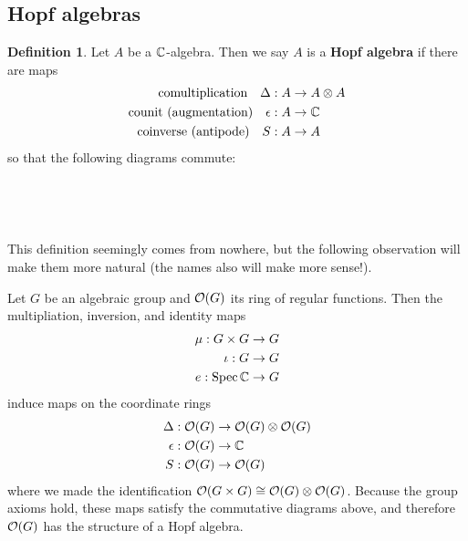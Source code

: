 \documentclass{amsart}
\numberwithin{equation}{section}
\theoremstyle{plain} %
\theoremstyle{definition}
\newtheorem{definition}[equation]{Definition}
\theoremstyle{remark}
\begin{document}
\subsection{Hopf algebras}
\begin{definition}\label{def:hopf}
    Let $A$ be a $\mathbb{C}$-algebra. Then we say $A$ is a \textbf{Hopf algebra} if there are maps \begin{align*}
        \text{comultiplication\quad}\Delta: A &\to A\otimes A \\
        \text{counit (augmentation)\quad}\epsilon: A &\to \mathbb{C} \\
        \text{coinverse (antipode)\quad}S: A &\to A
    \end{align*}
    so that the following diagrams commute:
    \begin{center}
         \\

         \\
        

    \end{center}
\end{definition}
This definition seemingly comes from nowhere, but the following observation will make them more natural
(the names also will make more sense!).

\hfill

Let $G$ be an algebraic group and $\mathcal{O}(G)$ its ring of regular functions. Then the multipliation,
inversion, and identity maps \begin{align*}
    \mu: G\times G &\to G \\
    \iota: G &\to G \\
    e: \operatorname{Spec} \mathbb{C} &\to G
\end{align*}
induce maps on the coordinate rings
\begin{align*}
    \Delta: \mathcal{O}(G) &\to \mathcal{O}(G)\otimes \mathcal{O}(G) \\
    \epsilon: \mathcal{O}(G) &\to \mathbb{C} \\
    S: \mathcal{O}(G) &\to \mathcal{O}(G)
\end{align*} where we made the identification $\mathcal{O}(G\times G) \cong \mathcal{O}(G)\otimes \mathcal{O}(G)$.
Because the group axioms hold, these maps satisfy the commutative diagrams above, and therefore
$\mathcal{O}(G)$ has the structure of a Hopf algebra.
\end{document}
